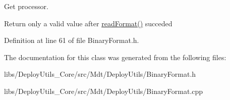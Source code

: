 Get processor. 

Return only a valid value after \hyperlink{class_mdt_1_1_deploy_utils_1_1_binary_format_a9a0d738562a41af21b81d12199b62ea4}{read\+Format()} succeded 

Definition at line 61 of file Binary\+Format.\+h.



The documentation for this class was generated from the following files\+:\begin{DoxyCompactItemize}
\item 
libs/\+Deploy\+Utils\+\_\+\+Core/src/\+Mdt/\+Deploy\+Utils/Binary\+Format.\+h\item 
libs/\+Deploy\+Utils\+\_\+\+Core/src/\+Mdt/\+Deploy\+Utils/Binary\+Format.\+cpp\end{DoxyCompactItemize}
